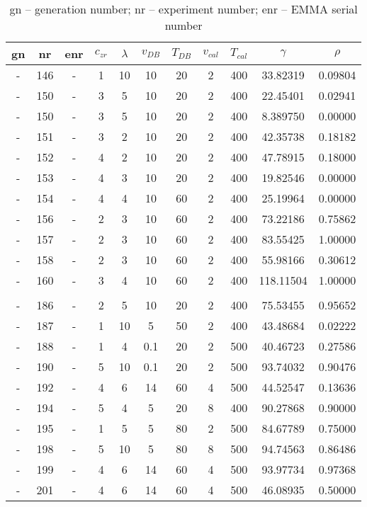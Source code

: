 \begin{table}[ht]
	\centering
	\label{tab:pre-emma}
	\begin{tabular}{ccc|cccccc|cc}
        \hline\hline
		gn  &nr	    &enr	&$c_{zr}$	    &$\lambda$	&$v_{DB}$	&$T_{DB}$	&$v_{cal}$	&$T_{cal}$	&$\gamma$	&$\rho$\\
        \hline
-	&146	&-		&1	&10	&10	&20	&2	&400 &33.82319	&0.09804\\
-	&150	&-		&3	&5	&10	&20	&2	&400 &22.45401	&0.02941\\
-	&150	&-		&3	&5	&10	&20	&2	&400 &8.389750	&0.00000\\
-	&151	&-		&3	&2	&10	&20	&2	&400 &42.35738	&0.18182\\
-	&152	&-		&4	&2	&10	&20	&2	&400 &47.78915	&0.18000\\
-	&153	&-		&4	&3	&10	&20	&2	&400 &19.82546	&0.00000\\
-	&154	&-		&4	&4	&10	&60	&2	&400 &25.19964	&0.00000\\
-	&156	&-		&2	&3	&10	&60	&2	&400 &73.22186	&0.75862\\
-	&157	&-		&2	&3	&10	&60	&2	&400 &83.55425	&1.00000\\
-	&158	&-		&2	&3	&10	&60	&2	&400 &55.98166	&0.30612\\
-	&160	&-		&3	&4	&10	&60	&2	&400 &118.11504	&1.00000\\
   			   	                            &&&&&&&&&&\\
-	&186	&-		&2	&5	&10	&20	&2	&400 &75.53455	&0.95652\\
-	&187	&-		&1	&10	&5	&50	&2	&400 &43.48684	&0.02222\\
-	&188	&-		&1	&4	&0.1	&20	&2	&500 &40.46723	&0.27586\\
-	&190	&-		&5	&10	&0.1	&20	&2	&500 &93.74032	&0.90476\\
-	&192	&-		&4	&6	&14	&60	&4	&500 &44.52547	&0.13636\\
-	&194	&-		&5	&4	&5	&20	&8	&400 &90.27868	&0.90000\\
-	&195	&-		&1	&5	&5	&80	&2	&500 &84.67789	&0.75000\\
-	&198	&-		&5	&10	&5	&80	&8	&500 &94.74563	&0.86486\\
-	&199	&-		&4	&6	&14	&60	&4	&500 &93.97734	&0.97368\\
-	&201	&-		&4	&6	&14	&60	&4	&500 &46.08935	&0.50000\\
    \hline\hline
	\end{tabular}
    \caption{
        gn -- generation number; 
        nr -- experiment number; 
        enr -- EMMA serial number} 
\end{table}


